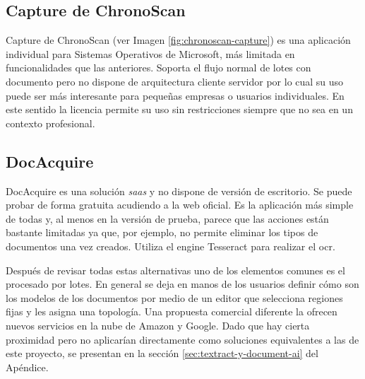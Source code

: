 \subsection{Capture de ChronoScan}

Capture de ChronoScan \cite{solucionesComerciales_chronoScanCapture_chronoScanDocumentCapture} (ver Imagen \ref{fig:chronoscan-capture}) es una aplicación individual para Sistemas Operativos de Microsoft, más limitada en funcionalidades que las anteriores. Soporta el flujo normal de lotes con documento pero no dispone de arquitectura cliente servidor por lo cual su uso puede ser más interesante para pequeñas empresas o usuarios individuales. En este sentido la licencia permite su uso sin restricciones siempre que no sea en un contexto profesional.

\subsection{DocAcquire}

DocAcquire \cite{solucionesComerciales_docAcquire_docAcquire} es una solución \emph{\acrlong{saas}} y no dispone de versión de escritorio. Se puede probar de forma gratuita acudiendo a la web oficial. Es la aplicación más simple de todas y, al menos en la versión de prueba, parece que las acciones están bastante limitadas ya que, por ejemplo, no permite eliminar los tipos de documentos una vez creados. Utiliza el engine Tesseract para realizar el \acrshort{ocr}.

\newpage
Después de revisar todas estas alternativas uno de los elementos comunes es el procesado por lotes. En general se deja en manos de los usuarios definir cómo son los modelos de los documentos por medio de un editor que selecciona regiones fijas y les asigna una topología. Una propuesta comercial diferente la ofrecen nuevos servicios en la nube de Amazon y Google. Dado que hay cierta proximidad pero no aplicarían directamente como soluciones equivalentes a las de este proyecto, se presentan en la sección \ref{sec:textract-y-document-ai} del Apéndice.

